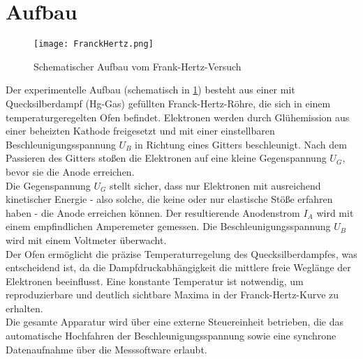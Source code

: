 \section{Aufbau}

\begin{figure}[H]
    \centering
    \texttt{[image: FranckHertz.png]}
    \caption{Schematischer Aufbau vom Frank-Hertz-Versuch \cite{FranckHertzHg}} 
    \label{fig:FrankHertzSchaltung}    
\end{figure}

Der experimentelle Aufbau (schematisch in \cref{fig:FrankHertzSchaltung}) besteht aus einer mit Quecksilberdampf (Hg-Gas) gefüllten Franck-Hertz-Röhre, die sich in einem temperaturgeregelten Ofen befindet. Elektronen werden durch Glühemission aus einer beheizten Kathode freigesetzt und mit einer einstellbaren Beschleunigungsspannung $ U_B $ in Richtung eines Gitters beschleunigt. Nach dem Passieren des Gitters stoßen die Elektronen auf eine kleine Gegenspannung $ U_G $, bevor sie die Anode erreichen.
\vspace{0.3cm}\\
Die Gegenspannung $ U_G $ stellt sicher, dass nur Elektronen mit ausreichend kinetischer Energie - also solche, die keine oder nur elastische Stöße erfahren haben - die Anode erreichen können. Der resultierende Anodenstrom $ I_A $ wird mit einem empfindlichen Amperemeter gemessen. Die Beschleunigungsspannung $ U_B $ wird mit einem Voltmeter überwacht.
\vspace{0.3cm}\\
Der Ofen ermöglicht die präzise Temperaturregelung des Quecksilberdampfes, was entscheidend ist, da die Dampfdruckabhängigkeit die mittlere freie Weglänge der Elektronen beeinflusst. Eine konstante Temperatur ist notwendig, um reproduzierbare und deutlich sichtbare Maxima in der Franck-Hertz-Kurve zu erhalten.
\vspace{0.3cm}\\
Die gesamte Apparatur wird über eine externe Steuereinheit betrieben, die das automatische Hochfahren der Beschleunigungsspannung sowie eine synchrone Datenaufnahme über die Messsoftware erlaubt.
\vspace{0.3cm}\\


